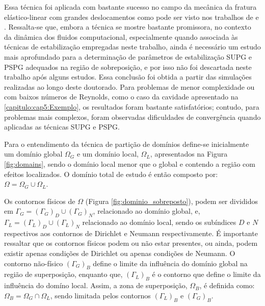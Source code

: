 Essa técnica foi aplicada com bastante sucesso no campo da mecânica da fratura elástico-linear com grandes deslocamentos como pode ser visto nos trabalhos de  e . Ressalta-se que, embora a técnica se mostre bastante promissora, no contexto da dinâmica dos fluidos computacional, especialmente quando associada às técnicas de estabilização empregadas neste trabalho, ainda é necessário um estudo mais aprofundado para a determinação de parâmetros de estabilização SUPG e PSPG adequados na região de sobreposição, e por isso não foi descartada neste trabalho após alguns estudos. Essa conclusão foi obtida a partir das simulações realizadas ao longo deste doutorado. Para problemas de menor complexidade ou com baixos números de Reynolds, como o caso da cavidade apresentado na \autoref{capitulo:cap5:Exemplo}, os resultados foram bastante satisfatórios; contudo, para problemas mais complexos, foram observadas dificuldades de convergência quando aplicadas as técnicas SUPG e PSPG.

Para o entendimento da técnica de partição de domínios define-se inicialmente um domínio global $\Omega_G$ e um domínio local, $\Omega_L$, apresentados na Figura \ref{fig:domains}, sendo o domínio local menor que o global e contendo a região com efeitos localizados. O domínio total de estudo é então composto por: $\Omega = \Omega_G \cup \Omega_L$.

Os contornos físicos de $\Omega$  (Figura \ref{fig:dominio_sobreposto}), podem ser divididos em $\Gamma_{G} = (\Gamma_{G})_D \cup (\Gamma_{G})_N$, relacionado ao domínio global, e, $\Gamma_{L} = (\Gamma_{L})_D \cup (\Gamma_{L})_N$ relacionado ao domínio local, sendo os subíndices $D$ e $N$ respectivos aos contornos de Dirichlet e Neumann respectivamente. É importante ressaltar que os contornos físicos podem ou não estar presentes, ou ainda, podem existir apenas condições de Dirichlet ou apenas condições de Neumann. O contorno não-físico $(\Gamma_{G})_{B}$ define o limite da influência do domínio global na região de superposição, enquanto que, $(\Gamma_{L})_{B}$ é o contorno que define o limite da influência do domíno local. Assim, a zona de superposição, $\Omega_{B}$, é definida como: $ \Omega_{B} = \Omega_G \cap \Omega_L$, sendo limitada pelos contornos $(\Gamma_{L})_{B}$ e $(\Gamma_{G})_{B}$.

